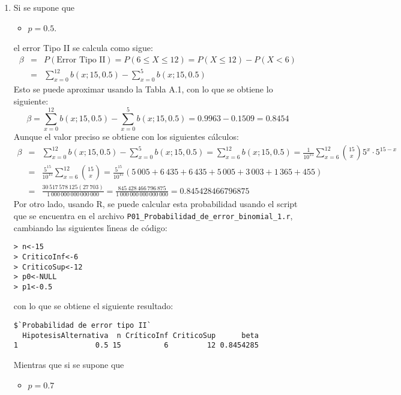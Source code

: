 \begin{solucion}
\begin{enumerate}
  \item Si se supone que
  \begin{itemize}
   \item $p = 0.5$.
  \end{itemize}
  el error Tipo II se calcula como sigue:
  \begin{eqnarray*}
   \beta & = & P(\text{Error Tipo II}) = P(6 \leq X \leq 12) = P(X\leq 12) - P(X<6) \\
   & = & \sum_{x=0}^{12} b(x;15,0.5) - \sum_{x=0}^{5}b(x;15,0.5)
  \end{eqnarray*}
  Esto se puede aproximar usando la Tabla A.1, con lo que se obtiene lo siguiente:
  \begin{equation*}
   \beta = \sum_{x=0}^{12} b(x;15,0.5) - \sum_{x=0}^{5}b(x;15,0.5) = 0.9963 - 0.1509 = 0.8454
  \end{equation*}
  Aunque el valor preciso se obtiene con los siguientes c\'alculos:
  \begin{eqnarray*}
   \beta & = & \sum_{x=0}^{12} b(x;15,0.5) - \sum_{x=0}^{5}b(x;15,0.5) = \sum_{x=6}^{12} b(x;15,0.5) = \frac{1}{10^{15}} \sum_{x=6}^{12} \binom{15}{x}5^x\cdot 5^{15-x} \\
   & = & \frac{5^{15}}{10^{15}} \sum_{x=6}^{12} \binom{15}{x} = \frac{5^{15}}{10^{15}} (5\,005 + 6\,435 + 6\,435 + 5\,005 + 3\,003 + 1\,365 + 455) \\
   & = & \frac{30\,517\,578\,125 (27\,703)}{1\,000\,000\,000\,000\,000} = \frac{845\,428\,466\,796\,875}{1\,000\,000\,000\,000\,000} = 0.845428466796875
  \end{eqnarray*}
  Por otro lado, usando R, se puede calcular esta probabilidad usando el script que se encuentra en el archivo \texttt{P01\_Probabilidad\_de\_error\_binomial\_1.r}, cambiando las siguientes l\'{\i}neas de c\'odigo:
  \begin{verbatim}
> n<-15
> CriticoInf<-6
> CriticoSup<-12
> p0<-NULL
> p1<-0.5
  \end{verbatim}
  \vspace{-0.5cm}
  con lo que se obtiene el siguiente resultado:
  \begin{verbatim}
$`Probabilidad de error tipo II`
  HipotesisAlternativa  n CríticoInf CriticoSup      beta
1                  0.5 15          6         12 0.8454285
  \end{verbatim}
  \vspace{-0.5cm}
  Mientras que si se supone que
  \begin{itemize}
   \item $p = 0.7$
  \end{itemize}

\end{enumerate}
\end{solucion}
